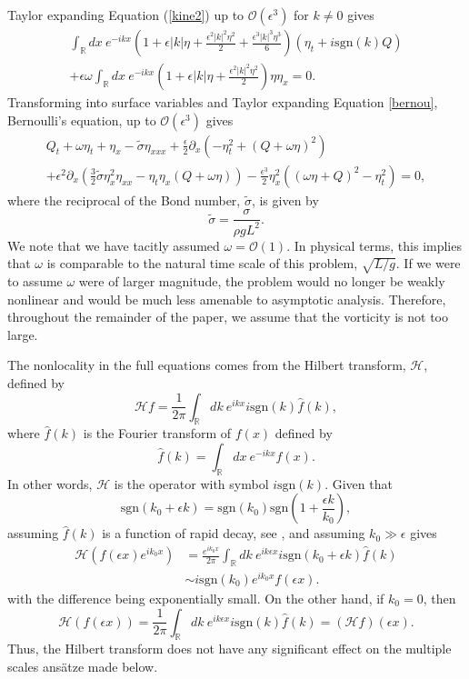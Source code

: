\documentclass{JFM_Style/jfm}
\newcommand{\pd}{\partial}
\begin{document}
Taylor expanding Equation (\ref{kine2}) up to $\mathcal{O}(\epsilon^3)$ for $k\neq 0$ gives
\begin{multline}
\int_{\mathbb{R}}dx~e^{-ikx}\left(1 + \epsilon |k|\eta + \frac{\epsilon^{2}|k|^{2}\eta^{2}}{2} + \frac{\epsilon^{3}|k|^{3}\eta^{3}}{6}\right)\left(\eta_{t} + i \mbox{sgn}(k)Q \right) \\
+ \epsilon \omega \int_{\mathbb{R}}dx~e^{-ikx}\left(1 + \epsilon |k|\eta + \frac{\epsilon^{2}|k|^{2}\eta^{2}}{2}\right) \eta \eta_{x} = 0.
\label{integro1}
\end{multline}
Transforming into surface variables and Taylor expanding Equation \eqref{bernou}, Bernoulli's equation, up to $\mathcal{O}(\epsilon^3)$ gives
\begin{multline}
Q_{t} + \omega \eta_{t} + \eta_{x} - \tilde{\sigma}\eta_{xxx} + \frac{\epsilon}{2}\pd_{x}\left(-\eta_{t}^{2} + (Q+\omega \eta)^{2} \right)\\
+ \epsilon^{2}\pd_{x}\left( \frac{3}{2}\tilde{\sigma}\eta_{x}^{2}\eta_{xx} - \eta_{t}\eta_{x} \left(Q  + \omega \eta \right) \right) - \frac{\epsilon^{3}}{2}\eta_{x}^{2}\left((\omega\eta+Q)^{2}-\eta_{t}^{2}\right) = 0,
\label{berexp}
\end{multline}
where the reciprocal of the Bond number, $\tilde{\sigma}$, is given by
\[
\tilde{\sigma} = \frac{\sigma}{\rho g L^2}.
\]
We note that we have tacitly assumed $\omega = \mathcal{O}(1)$.  In physical terms, this implies that $\omega$ is comparable to the natural time scale of this problem, $\sqrt{L/g}$.  If we were to assume $\omega$ were of larger magnitude, the problem would no longer be weakly nonlinear and would be much less amenable to asymptotic analysis.  Therefore, throughout the remainder of the paper, we assume that the vorticity is not too large.

The nonlocality in the full equations comes from the Hilbert transform, $\mathcal{H}$, defined by
\[
\mathcal{H}f = \frac{1}{2\pi}\int_{\mathbb{R}}dk~ e^{ikx}  i\mbox{sgn}(k) \hat{f}(k),
\]
where $\hat{f}(k)$ is the Fourier transform of $f(x)$ defined by
\[
\hat{f}(k) = \int_{\mathbb{R}}dx~ e^{-ikx}f(x).
\]
In other words, $\mathcal{H}$ is the operator with symbol $i\mbox{sgn}(k)$.  Given that
\[
\mbox{sgn}(k_{0} + \epsilon k) = \mbox{sgn}(k_{0})\mbox{sgn}\left( 1 + \frac{\epsilon k}{k_{0}}\right),
\]
assuming $\hat{f}(k)$ is a function of rapid decay, see \cite{folland},  and assuming $k_{0}\gg \epsilon$ gives
\begin{align}
\mathcal{H}\left( f(\epsilon x) e^{ik_{0}x} \right)& =
\frac{e^{ik_{0}x}}{2\pi}\int_{\mathbb{R}}dk~ e^{ik\epsilon x}
i\mbox{sgn}(k_{0}+\epsilon k) \hat{f}(k)\nonumber \\ & \sim i\mbox{sgn}(k_{0})e^{ik_{0}x}f(\epsilon x).\nonumber
\end{align}
with the difference being exponentially small.  On the other hand, if $k_{0}=0$, then
\[
\mathcal{H}\left( f(\epsilon x) \right) = \frac{1}{2\pi}\int_{\mathbb{R}}dk~ e^{ik\epsilon x}  i\mbox{sgn}(k) \hat{f}(k) = (\mathcal{H}f)(\epsilon x).
\]
Thus, the Hilbert transform does not have any significant effect on the multiple scales ans\"{a}tze made below.
\end{document}

